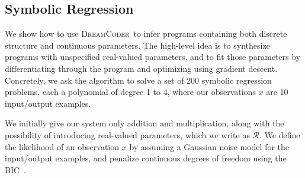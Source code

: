 \documentclass{article}
\newcommand{\system}{\textsc{DreamCoder}~}
\newcommand{\probability}{\mathds{P}} %
\begin{document}



\subsection{Symbolic Regression}\label{regressionSection}
We show how to use \system to infer programs containing both discrete
structure and continuous parameters. The high-level idea is to synthesize programs with unspecified real-valued parameters, and to fit those parameters by differentiating through the program
and optimizing using gradient descent.
Concretely, we ask the algorithm to
solve a set of 200 symbolic regression problems, each a polynomial of
degree 1 to 4, where our observations $x$ are 10
input/output examples.%

We initially give our system only addition and multiplication,
along with the possibility of introducing real-valued parameters, which we write as $\mathcal{R}$.
We define the likelihood of an observation $x$ by assuming a Gaussian noise model for the input/output examples,
and penalize continuous degrees of freedom using the BIC~\cite{Bishop:2006:PRM:1162264}.

\end{document}
